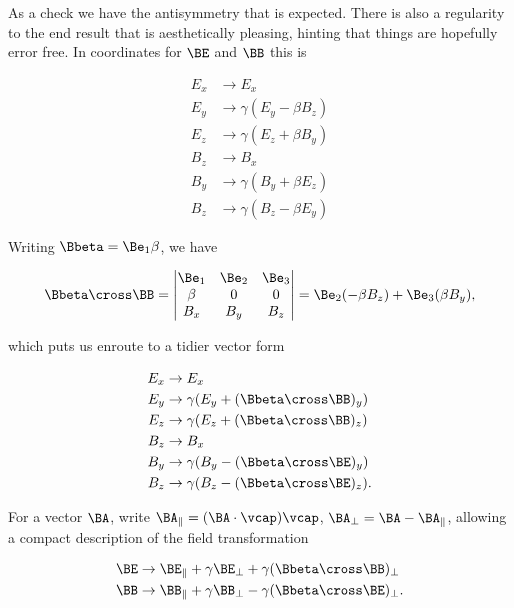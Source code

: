 As a check we have the antisymmetry that is expected.  There is also a regularity to the end result that is aesthetically pleasing, hinting that things are hopefully error free.  In coordinates for $\BE$ and $\BB$ this is

\begin{align}\label{eqn:relElectroDynProblemSet3:1320}
E_x &\rightarrow E_x \\
E_y &\rightarrow \gamma ( E_y - \beta B_z ) \\
E_z &\rightarrow \gamma ( E_z + \beta B_y ) \\
B_z &\rightarrow B_x \\
B_y &\rightarrow \gamma ( B_y + \beta E_z ) \\
B_z &\rightarrow \gamma ( B_z - \beta E_y ) 
\end{align}

Writing $\Bbeta = \Be_1 \beta$, we have

\begin{equation}\label{eqn:relElectroDynProblemSet3:1340}
\Bbeta \cross \BB = 
\begin{vmatrix} 
\Be_1 & \Be_2 & \Be_3 \\
\beta & 0 & 0 \\
B_x & B_y & B_z
\end{vmatrix} 
= \Be_2 (-\beta B_z) + \Be_3( \beta B_y ),
\end{equation}

which puts us enroute to a tidier vector form

\begin{align}\label{eqn:relElectroDynProblemSet3:1360}
E_x &\rightarrow E_x \\
E_y &\rightarrow \gamma ( E_y + (\Bbeta \cross \BB)_y ) \\
E_z &\rightarrow \gamma ( E_z + (\Bbeta \cross \BB)_z ) \\
B_z &\rightarrow B_x \\
B_y &\rightarrow \gamma ( B_y - (\Bbeta \cross \BE)_y ) \\
B_z &\rightarrow \gamma ( B_z - (\Bbeta \cross \BE)_z ).
\end{align}

For a vector $\BA$, write $\BA_\parallel = (\BA \cdot \vcap)\vcap$, $\BA_\perp = \BA - \BA_\parallel$, allowing a compact description of the field transformation

\begin{align}\label{eqn:relElectroDynProblemSet3:1380}
\BE &\rightarrow \BE_\parallel + \gamma \BE_\perp + \gamma (\Bbeta \cross \BB)_\perp \\
\BB &\rightarrow \BB_\parallel + \gamma \BB_\perp - \gamma (\Bbeta \cross \BE)_\perp.
\end{align}

